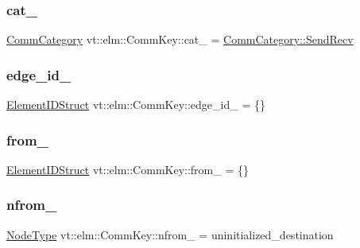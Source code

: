 \subsubsection{\texorpdfstring{cat\+\_\+}{cat\_}}
{\footnotesize\ttfamily \hyperlink{namespacevt_1_1elm_ab7367fdbe88bdcf329563642147f9ae2}{Comm\+Category} vt\+::elm\+::\+Comm\+Key\+::cat\+\_\+ = \hyperlink{namespacevt_1_1elm_ab7367fdbe88bdcf329563642147f9ae2a95aeb71ffd419cc14c6929f9dcd6cdff}{Comm\+Category\+::\+Send\+Recv}}

\mbox{\label{structvt_1_1elm_1_1_comm_key_a05f9fc628259a6d899b8948228190723}} 
\subsubsection{\texorpdfstring{edge\+\_\+id\+\_\+}{edge\_id\_}}
{\footnotesize\ttfamily \hyperlink{structvt_1_1elm_1_1_element_i_d_struct}{Element\+I\+D\+Struct} vt\+::elm\+::\+Comm\+Key\+::edge\+\_\+id\+\_\+ = \{\}}

\mbox{\label{structvt_1_1elm_1_1_comm_key_a550e5ff8b28436a977e8bf704afa7427}} 
\subsubsection{\texorpdfstring{from\+\_\+}{from\_}}
{\footnotesize\ttfamily \hyperlink{structvt_1_1elm_1_1_element_i_d_struct}{Element\+I\+D\+Struct} vt\+::elm\+::\+Comm\+Key\+::from\+\_\+ = \{\}}

\mbox{\label{structvt_1_1elm_1_1_comm_key_a8d37a724bb947b07e514320ff5f3c3b6}} 
\subsubsection{\texorpdfstring{nfrom\+\_\+}{nfrom\_}}
{\footnotesize\ttfamily \hyperlink{namespacevt_a866da9d0efc19c0a1ce79e9e492f47e2}{Node\+Type} vt\+::elm\+::\+Comm\+Key\+::nfrom\+\_\+ = uninitialized\+\_\+destination}

